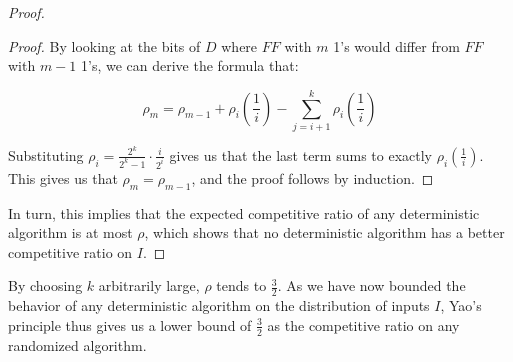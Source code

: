\begin{proof}
\begin{proof}



By looking at the bits of $D$ where $FF$ with $m$ 1's would differ from $FF$ with $m-1$ 1's, we can derive the formula that:

\[\rho_m = \rho_{m-1} + \rho_i\left(\frac{1}{i}\right) - \sum_{j=i+1}^k \rho_i\left(\frac{1}{i}\right)\]

Substituting $\rho_i = \frac{2^k}{2^k-1}\cdot\frac{i}{2^i}$ gives us that the last term sums to exactly $\rho_i(\frac{1}{i})$.  This gives us that $\rho_m = \rho_{m-1}$, and the proof follows by induction.
\end{proof}

In turn, this implies that the expected competitive ratio of any deterministic algorithm is at most $\rho$, which shows that no deterministic algorithm has a better competitive ratio on $I$. 
\end{proof}

By choosing $k$ arbitrarily large, $\rho$ tends to $\frac{3}{2}$. As we have now bounded the behavior of any deterministic algorithm on the distribution of inputs $I$, Yao's principle thus gives us a lower bound of $\frac{3}{2}$ as the competitive ratio on any randomized algorithm.

